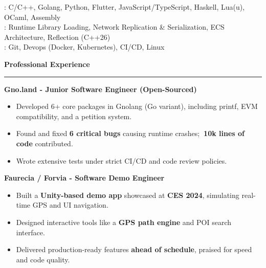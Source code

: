 \documentclass[9pt]{extarticle}
\begin{document}
\hspace*{5pt}{\bfseries Technical}: C/C++, Golang, Python, Flutter, JavaScript/TypeScript, Haskell, Lua(u), OCaml, Assembly
\\
\hspace*{5pt}{\bfseries Systems}: Runtime Library Loading, Network Replication \& Serialization, ECS Architecture, Reflection (C++26)
\\
\hspace*{5pt}{\bfseries Other}: Git, Devops (Docker, Kubernetes), CI/CD, Linux

\par\vspace{1pt}


{\large\bfseries Professional Experience}
\par\vspace{-8pt}
\rule{\linewidth}{0.4pt}
\par\vspace{1pt}

{\bfseries Gno.land - Junior Software Engineer (Open-Sourced)}
\begin{itemize}[noitemsep, topsep=0pt]
	\item Developed 6+ core packages in Gnolang (Go variant), including printf, EVM compatibility, and a petition system.
	\item Found and fixed {\bfseries 6 critical bugs} causing runtime crashes;{\bfseries ~10k lines of code} contributed.
	\item Wrote extensive tests under strict CI/CD and code review policies.
\end{itemize}

\par\vspace{1pt}

{\bfseries Faurecia / Forvia - Software Demo Engineer}
\begin{itemize}[noitemsep, topsep=0pt]
	\item Built a {\bfseries Unity-based demo app} showcased at {\bfseries CES 2024}, simulating real-time GPS and UI navigation.
	\item Designed interactive tools like a {\bfseries GPS path engine} and POI search interface.
	\item Delivered production-ready features {\bfseries ahead of schedule}, praised for speed and code quality.
\end{itemize}

\par\vspace{1pt}
\end{document}

